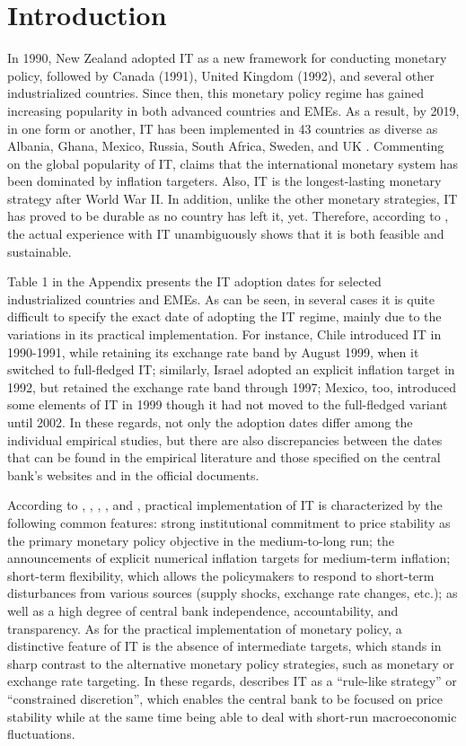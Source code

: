 \documentclass{article}
\begin{document}
\section{Introduction}

In 1990, New Zealand adopted IT as a new framework for conducting monetary policy, followed by Canada (1991), United Kingdom (1992), and several other industrialized countries. Since then, this monetary policy regime has gained increasing popularity in both advanced countries and EMEs. As a result, by 2019, in one form or another, IT has been implemented in 43 countries as diverse as Albania, Ghana, Mexico, Russia, South Africa, Sweden, and UK \citep{IMF2020}. Commenting on the global popularity of IT, \citet{rose2007} claims that the international monetary system has been dominated by inflation targeters. Also, IT is the longest-lasting monetary strategy after World War II. In addition, unlike the other monetary strategies, IT has proved to be durable as no country has left it, yet. Therefore, according to \citet{walsh2009}, the actual experience with IT unambiguously shows that it is both feasible and sustainable.

Table 1 in the Appendix presents the IT adoption dates for selected industrialized countries and EMEs. As can be seen, in several cases it is quite difficult to specify the exact date of adopting the IT regime, mainly due to the variations in its practical implementation. For instance, Chile introduced IT in 1990-1991, while retaining its exchange rate band by August 1999, when it switched to full-fledged IT; similarly, Israel adopted an explicit inflation target in 1992, but retained the exchange rate band through 1997; Mexico, too, introduced some elements of IT in 1999 though it had not moved to the full-fledged variant until 2002. In these regards, not only the adoption dates differ among the individual empirical studies, but there are also discrepancies between the dates that can be found in the empirical literature and those specified on the central bank’s websites and in the official documents.

According to \citet{bernanke1997}, \citet{hammond2012}, \citet{mishkin2000}, \citet{mishkin1997}, and \citet{svensson2002, svensson2010}, practical implementation of IT is characterized by the following common features: strong institutional commitment to price stability as the primary monetary policy objective in the medium-to-long run; the announcements of explicit numerical inflation targets for medium-term inflation; short-term flexibility, which allows the policymakers to respond to short-term disturbances from various sources (supply shocks, exchange rate changes, etc.); as well as a high degree of central bank independence, accountability, and transparency. As for the practical implementation of monetary policy, a distinctive feature of IT is the absence of intermediate targets, which stands in sharp contrast to the alternative monetary policy strategies, such as monetary or exchange rate targeting. In these regards, \citet{bernanke1997} describes IT as a “rule-like strategy” or “constrained discretion”, which enables the central bank to be focused on price stability while at the same time being able to deal with short-run macroeconomic fluctuations.
\end{document}
